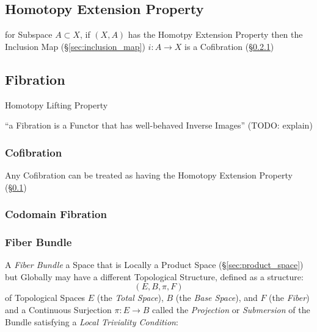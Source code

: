 \subsection{Homotopy Extension Property}\label{sec:homotopy_extension}

for Subspace $A \subset X$, if $(X,A)$ has the Homotpy Extension
Property then the Inclusion Map (\S\ref{sec:inclusion_map}) $i : A
\rightarrow X$ is a Cofibration (\S\ref{sec:cofibration})



\subsection{Fibration}\label{sec:fibration}

Homotopy Lifting Property

``a Fibration is a Functor that has well-behaved Inverse Images'' (TODO:
explain)



\subsubsection{Cofibration}\label{sec:cofibration}

Any Cofibration can be treated as having the Homotopy Extension
Property (\S\ref{sec:homotopy_extension})



\subsubsection{Codomain Fibration}\label{sec:codomain_fibration}

\subsubsection{Fiber Bundle}\label{sec:fiber_bundle}

A \emph{Fiber Bundle} a Space that is Locally a Product Space
(\S\ref{sec:product_space}) but Globally may have a different Topological
Structure, defined as a structure:
\[
  (E, B, \pi, F)
\]
of Topological Spaces $E$ (the \emph{Total Space}), $B$ (the \emph{Base
  Space}), and $F$ (the \emph{Fiber}) and a Continuous Surjection $\pi : E
\rightarrow B$ called the \emph{Projection} or \emph{Submersion} of the Bundle
satisfying a \emph{Local Triviality Condition}:

